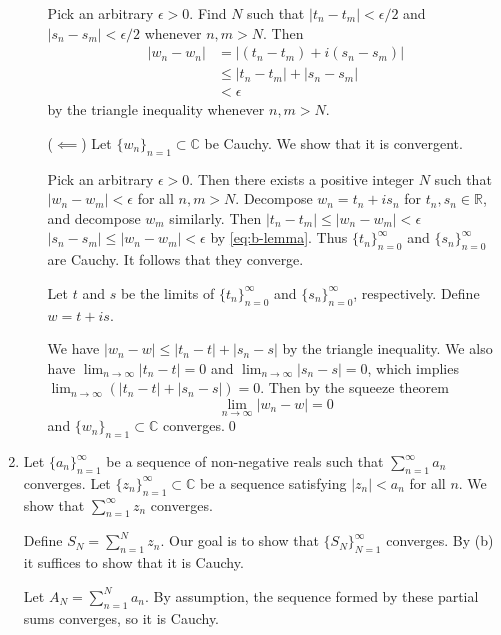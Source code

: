 \documentclass[oneside]{article}
\newcommand\abs[1]{\left|#1\right|}
\newcommand\bbC{\mathbb{C}}
\newcommand\bbR{\mathbb{R}}
\begin{document}
\begin{enumerate}[label=\textbf{(\alph*)}]
\begin{itemize}[leftmargin=34pt]
      Pick an arbitrary $\epsilon > 0$. Find $N$ such that
      $\abs{t_n - t_m} < \epsilon/2$ and $\abs{s_n - s_m} < \epsilon/2$
      whenever $n, m > N$. Then \begin{align*}
        \abs{w_n - w_n} &= \abs{(t_n - t_m) + i(s_n - s_m)} \\
        &\leq \abs{t_n - t_m} + \abs{s_n - s_m} \\
        &< \epsilon
      \end{align*} by the triangle inequality whenever $n, m > N$.

      \item[($\impliedby$)] Let $\{w_n\}_{n=1} \subset \bbC$ be Cauchy. We show
        that it is convergent.

        Pick an arbitrary $\epsilon > 0$. Then there exists a positive integer
        $N$ such that $\abs{w_n - w_m} < \epsilon$ for all $n, m > N$. Decompose
        $w_n = t_n + is_n$ for $t_n, s_n \in \bbR$, and decompose $w_m$
        similarly. Then $\abs{t_n - t_m} \leq \abs{w_n - w_m} < \epsilon$
        $\abs{s_n - s_m} \leq \abs{w_n - w_m} < \epsilon$ by \eqref{eq:b-lemma}.
        Thus $\{t_n\}_{n=0}^\infty$ and $\{s_n\}_{n=0}^\infty$ are Cauchy. It
        follows that they converge.

        Let $t$ and $s$ be the limits of $\{t_n\}_{n=0}^\infty$ and
        $\{s_n\}_{n=0}^\infty$, respectively. Define $w = t + is$.

        We have $\abs{w_n - w} \leq \abs{t_n - t} + \abs{s_n - s}$ by the
        triangle inequality. We also have $\lim_{n\to\infty}\abs{t_n - t} = 0$
        and $\lim_{n\to\infty}\abs{s_n - s} = 0$, which implies
        $\lim_{n\to\infty}(\abs{t_n - t} + \abs{s_n - s}) = 0$. Then by the
        squeeze theorem
        \[
          \lim_{n\to\infty}\abs{w_n - w} = 0
        \] and $\{w_n\}_{n=1} \subset \bbC$ converges.\qed
    \end{itemize}

    \item Let $\{a_n\}_{n=1}^\infty$ be a sequence of non-negative reals such
      that $\sum_{n=1}^\infty a_n$ converges. Let
      $\{z_n\}_{n=1}^\infty \subset \bbC$ be a sequence satisfying
      $\abs{z_n} < a_n$ for all $n$. We show that $\sum_{n=1}^\infty z_n$
      converges.

      Define $S_N = \sum_{n=1}^N z_n$. Our goal is to show that
      $\{S_N\}_{N=1}^\infty$ converges. By (b) it suffices to show that it is
      Cauchy.

      Let $A_N = \sum_{n=1}^N a_n$. By assumption, the sequence formed by these
      partial sums converges, so it is Cauchy.


\end{enumerate}
\end{document}
